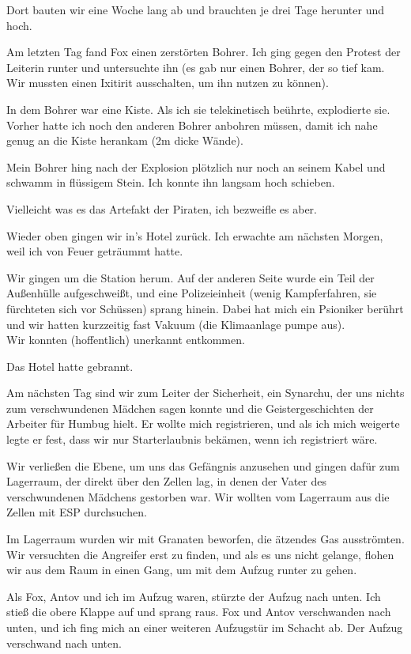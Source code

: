 \documentclass[11pt]{scrartcl}
\begin{document}
Dort bauten wir eine Woche lang ab und brauchten je drei Tage herunter
und hoch.

Am letzten Tag fand Fox einen zerstörten Bohrer. Ich ging gegen den
Protest der Leiterin runter und untersuchte ihn (es gab nur einen
Bohrer, der so tief kam. Wir mussten einen Ixitirit ausschalten, um ihn
nutzen zu können).

In dem Bohrer war eine Kiste. Als ich sie telekinetisch beührte,
explodierte sie. Vorher hatte ich noch den anderen Bohrer anbohren
müssen, damit ich nahe genug an die Kiste herankam (2m dicke Wände).

Mein Bohrer hing nach der Explosion plötzlich nur noch an seinem Kabel
und schwamm in flüssigem Stein. Ich konnte ihn langsam hoch schieben.

Vielleicht was es das Artefakt der Piraten, ich bezweifle es aber.

Wieder oben gingen wir in's Hotel zurück. Ich erwachte am nächsten
Morgen, weil ich von Feuer geträummt hatte.

Wir gingen um die Station herum. Auf der anderen Seite wurde ein Teil
der Außenhülle aufgeschweißt, und eine Polizeieinheit (wenig
Kampferfahren, sie fürchteten sich vor Schüssen) sprang hinein. Dabei
hat mich ein Psioniker berührt und wir hatten kurzzeitig fast Vakuum
(die Klimaanlage pumpe aus).\\ Wir konnten (hoffentlich) unerkannt
entkommen.

Das Hotel hatte gebrannt.

Am nächsten Tag sind wir zum Leiter der Sicherheit, ein Synarchu, der
uns nichts zum verschwundenen Mädchen sagen konnte und die
Geistergeschichten der Arbeiter für Humbug hielt. Er wollte mich
registrieren, und als ich mich weigerte legte er fest, dass wir nur
Starterlaubnis bekämen, wenn ich registriert wäre.

Wir verließen die Ebene, um uns das Gefängnis anzusehen und gingen dafür
zum Lagerraum, der direkt über den Zellen lag, in denen der Vater des
verschwundenen Mädchens gestorben war. Wir wollten vom Lagerraum aus die
Zellen mit ESP durchsuchen.

Im Lagerraum wurden wir mit Granaten beworfen, die ätzendes Gas
ausströmten. Wir versuchten die Angreifer erst zu finden, und als es uns
nicht gelange, flohen wir aus dem Raum in einen Gang, um mit dem Aufzug
runter zu gehen.

Als Fox, Antov und ich im Aufzug waren, stürzte der Aufzug nach unten.
Ich stieß die obere Klappe auf und sprang raus. Fox und Antov
verschwanden nach unten, und ich fing mich an einer weiteren Aufzugstür
im Schacht ab. Der Aufzug verschwand nach unten.
\end{document}
